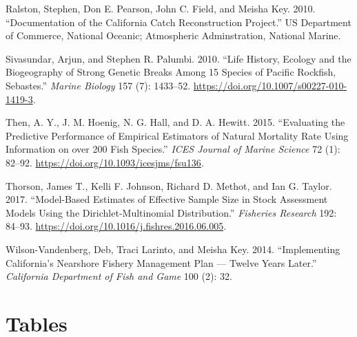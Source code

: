 \documentclass[11pt,
  english,
  a4paper,
]{article}
\begin{document}
\begin{cslreferences}
\leavevmode\hypertarget{ref-ralston_documentation_2010}{}%
Ralston, Stephen, Don E. Pearson, John C. Field, and Meisha Key. 2010. ``Documentation of the California Catch Reconstruction Project.'' US Department of Commerce, National Oceanic; Atmospheric Adminstration, National Marine.

\leavevmode\hypertarget{ref-sivasundar_life_2010}{}%
Sivasundar, Arjun, and Stephen R. Palumbi. 2010. ``Life History, Ecology and the Biogeography of Strong Genetic Breaks Among 15 Species of Pacific Rockfish, Sebastes.'' \emph{Marine Biology} 157 (7): 1433--52. \url{https://doi.org/10.1007/s00227-010-1419-3}.

\leavevmode\hypertarget{ref-then_evaluating_2015}{}%
Then, A. Y., J. M. Hoenig, N. G. Hall, and D. A. Hewitt. 2015. ``Evaluating the Predictive Performance of Empirical Estimators of Natural Mortality Rate Using Information on over 200 Fish Species.'' \emph{ICES Journal of Marine Science} 72 (1): 82--92. \url{https://doi.org/10.1093/icesjms/fsu136}.

\leavevmode\hypertarget{ref-thorson_model-based_2017}{}%
Thorson, James T., Kelli F. Johnson, Richard D. Methot, and Ian G. Taylor. 2017. ``Model-Based Estimates of Effective Sample Size in Stock Assessment Models Using the Dirichlet-Multinomial Distribution.'' \emph{Fisheries Research} 192: 84--93. \url{https://doi.org/10.1016/j.fishres.2016.06.005}.

\leavevmode\hypertarget{ref-wilson-vandenberg_implementing_2014}{}%
Wilson-Vandenberg, Deb, Traci Larinto, and Meisha Key. 2014. ``Implementing California's Nearshore Fishery Management Plan --- Twelve Years Later.'' \emph{California Department of Fish and Game} 100 (2): 32.
\end{cslreferences}

\leavevmode\tagmcend\tagstructend

\clearpage


\hypertarget{tables}{%
\section{Tables}\label{tables}}

\leavevmode\tagmcend\tagstructend



\newpage

\begingroup\fontsize{10}{12}\selectfont
\end{document}
